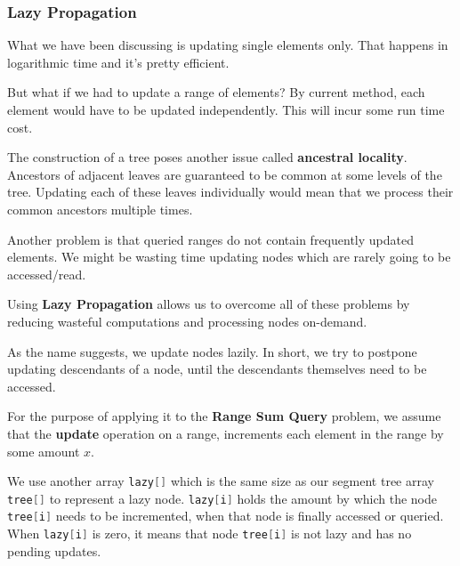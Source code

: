 \subsubsection{Lazy Propagation}
What we have been discussing is updating single elements only. That happens in logarithmic time and it's pretty efficient.

But what if we had to update a range of elements? By current method, each element would have to be updated independently. This will incur some run time cost.

The construction of a tree poses another issue called \textbf{ancestral locality}. Ancestors of adjacent leaves are guaranteed to be common at some levels of the tree. Updating each of these leaves individually would mean that we process their common ancestors multiple times. 

Another problem is that queried ranges do not contain frequently updated elements. We might be wasting time updating nodes which are rarely going to be accessed/read.

Using \textbf{Lazy Propagation} allows us to overcome all of these problems by reducing wasteful computations and processing nodes on-demand.

As the name suggests, we update nodes lazily. In short, we try to postpone updating descendants of a node, until the descendants themselves need to be accessed.

For the purpose of applying it to the \textbf{Range Sum Query} problem, we assume that the \textbf{update} operation on a range, increments each element in the range by some amount $x$.

We use another array \lstinline[language=C++, basicstyle=\small\ttfamily, keywordstyle=\bfseries\color{green!40!black}]|lazy[]| which is the same size as our segment tree array \lstinline[language=C++, basicstyle=\small\ttfamily, keywordstyle=\bfseries\color{green!40!black}]|tree[]| to represent a lazy node. \lstinline[language=C++, basicstyle=\small\ttfamily, keywordstyle=\bfseries\color{green!40!black}]|lazy[i]| holds the amount by which the node \lstinline[language=C++, basicstyle=\small\ttfamily, keywordstyle=\bfseries\color{green!40!black}]|tree[i]| needs to be incremented, when that node is finally accessed or queried. When \lstinline[language=C++, basicstyle=\small\ttfamily, keywordstyle=\bfseries\color{green!40!black}]|lazy[i]| is zero, it means that node \lstinline[language=C++, basicstyle=\small\ttfamily, keywordstyle=\bfseries\color{green!40!black}]|tree[i]| is not lazy and has no pending updates.

